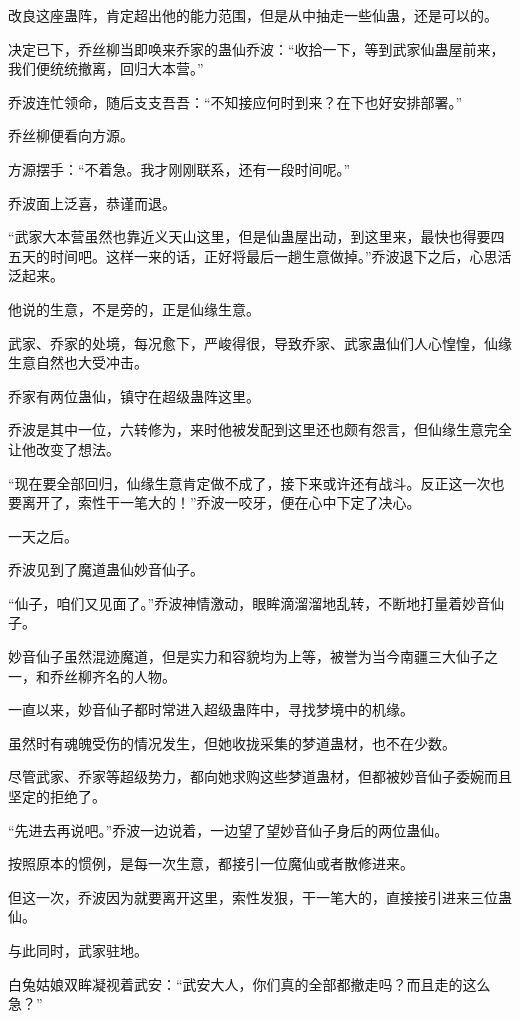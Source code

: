 \begin{this_body}
改良这座蛊阵，肯定超出他的能力范围，但是从中抽走一些仙蛊，还是可以的。

决定已下，乔丝柳当即唤来乔家的蛊仙乔波：“收拾一下，等到武家仙蛊屋前来，我们便统统撤离，回归大本营。”

乔波连忙领命，随后支支吾吾：“不知接应何时到来？在下也好安排部署。”

乔丝柳便看向方源。

方源摆手：“不着急。我才刚刚联系，还有一段时间呢。”

乔波面上泛喜，恭谨而退。

“武家大本营虽然也靠近义天山这里，但是仙蛊屋出动，到这里来，最快也得要四五天的时间吧。这样一来的话，正好将最后一趟生意做掉。”乔波退下之后，心思活泛起来。

他说的生意，不是旁的，正是仙缘生意。

武家、乔家的处境，每况愈下，严峻得很，导致乔家、武家蛊仙们人心惶惶，仙缘生意自然也大受冲击。

乔家有两位蛊仙，镇守在超级蛊阵这里。

乔波是其中一位，六转修为，来时他被发配到这里还也颇有怨言，但仙缘生意完全让他改变了想法。

“现在要全部回归，仙缘生意肯定做不成了，接下来或许还有战斗。反正这一次也要离开了，索性干一笔大的！”乔波一咬牙，便在心中下定了决心。

一天之后。

乔波见到了魔道蛊仙妙音仙子。

“仙子，咱们又见面了。”乔波神情激动，眼眸滴溜溜地乱转，不断地打量着妙音仙子。

妙音仙子虽然混迹魔道，但是实力和容貌均为上等，被誉为当今南疆三大仙子之一，和乔丝柳齐名的人物。

一直以来，妙音仙子都时常进入超级蛊阵中，寻找梦境中的机缘。

虽然时有魂魄受伤的情况发生，但她收拢采集的梦道蛊材，也不在少数。

尽管武家、乔家等超级势力，都向她求购这些梦道蛊材，但都被妙音仙子委婉而且坚定的拒绝了。

“先进去再说吧。”乔波一边说着，一边望了望妙音仙子身后的两位蛊仙。

按照原本的惯例，是每一次生意，都接引一位魔仙或者散修进来。

但这一次，乔波因为就要离开这里，索性发狠，干一笔大的，直接接引进来三位蛊仙。

与此同时，武家驻地。

白兔姑娘双眸凝视着武安：“武安大人，你们真的全部都撤走吗？而且走的这么急？”


\end{this_body}
